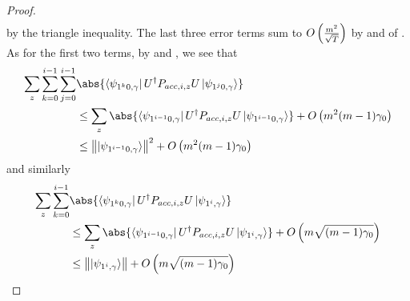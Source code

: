 \begin{proof}
\begin{align*}
	\end{align*}
	by the triangle inequality.
	The last three error terms sum to $O\left(\frac{m^2}{\sqrt{T}}\right)$ by  and  of .
	As for the first two terms, by  and , we see that
	\begin{align*}
		\sum_z \sum_{k=0}^{i-1}\sum_{j=0}^{i-1}
		&\abs{\bra{\psi_{1^k0,\gamma}}U^\dag  P_{acc,i,z}U \ket{\psi_{1^j0,\gamma}}} \\
		&\leq\sum_z \abs{\bra{\psi_{1^{i-1}0,\gamma}}U^\dag  P_{acc,i,z}U \ket{\psi_{1^{i-1}0,\gamma}}} + O\L(m^2(m-1)\gamma_0\R) \\
		&\leq\norm{\ket{\psi_{1^{i-1}0,\gamma}}}^2 + O\L(m^2(m-1)\gamma_0\R)
	\end{align*}
	and similarly
	\begin{align*}
		\sum_z\sum_{k=0}^{i-1}
		&\abs{\bra{\psi_{1^k0,\gamma}}U^\dag  P_{acc,i,z}U \ket{\psi_{1^i,\gamma}}}\\
		&\leq\sum_z\abs{\bra{\psi_{1^{i-1}0,\gamma}}U^\dag  P_{acc,i,z}U \ket{\psi_{1^i,\gamma}}}+O\L(m\sqrt{(m-1)\gamma_0}\R)\\
		&\leq\norm{\ket{\psi_{1^i,\gamma}}}+O\L(m\sqrt{(m-1)\gamma_0}\R)
	\end{align*}
\end{proof}

